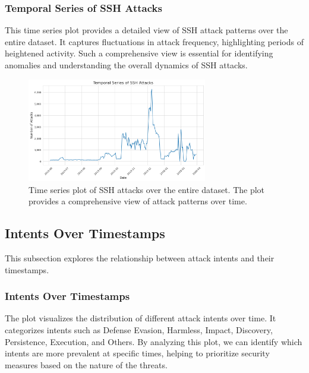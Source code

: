         \subsubsection{Temporal Series of SSH Attacks \\}
        
            This time series plot provides a detailed view of SSH attack patterns over the entire dataset. It captures fluctuations in attack frequency, highlighting periods of heightened activity. Such a comprehensive view is essential for identifying anomalies and understanding the overall dynamics of SSH attacks.

            \begin{figure}[H]
                \centering
                \includegraphics[width=0.7\textwidth]{../figures/plots/section1/temporal_series_of_ssh_attacks.png}
                \caption{Time series plot of SSH attacks over the entire dataset. The plot provides a comprehensive view of attack patterns over time.}
                \label{fig:temporal_series_of_ssh_attacks}
            \end{figure}

    \subsection{Intents Over Timestamps}

        This subsection explores the relationship between attack intents and their timestamps.

        \subsubsection{Intents Over Timestamps \\}
        
            The plot visualizes the distribution of different attack intents over time. It categorizes intents such as Defense Evasion, Harmless, Impact, Discovery, Persistence, Execution, and Others. By analyzing this plot, we can identify which intents are more prevalent at specific times, helping to prioritize security measures based on the nature of the threats.

